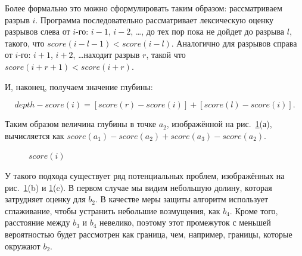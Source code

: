 \documentclass[12pt]{article}
\begin{document}
\begin{enumerate}
{		Более формально это можно сформулировать таким образом: рассматриваем разрыв $i$. Программа последовательно рассматривает лексическую оценку разрывов слева от $i$-го: $i-1$, $i-2$, \ldots, до тех пор пока не дойдет до разрыва $l$, такого, что $score(i-l-1) < score(i-l)$. Аналогично для разрывов справа от $i$-го: $i+1$, $i+2$, \ldots находит разрыв $r$, такой что $score(i+r+1) < score(i+r)$. 
		
		И, наконец, получаем значение глубины: 
		\vspace{-35pt}
		\begin{center}
			$$depth-score(i) = [score(r) - score(i)] + [score(l) - score(i)].$$
		\end{center}
		
		Таким образом величина глубины в точке $a_2$, изображённой на \linebreak рис.~\ref{im3}(а), вычисляется как $score(a_1) - score(a_2) + score(a_3) - score(a_2)$.
		
		\vspace{5pt}
		\begin{figure}[h!]
			\caption{$score(i)$}
			\label{im3}
		\end{figure}
		\vspace{5pt}
		
		У такого подхода существует ряд потенциальных проблем, изображённых на рис.~\ref{im3}(b) и \ref{im3}(c). В первом случае мы видим небольшую долину, которая затрудняет оценку для $b_2$. В качестве меры защиты алгоритм использует сглаживание, чтобы устранить небольшие возмущения, как $b_4$. Кроме того, расстояние между $b_3$ и $b_4$ невелико, поэтому этот промежуток с меньшей вероятностью будет рассмотрен как граница, чем, например, границы, которые окружают $b_2$. 
		
}
\end{enumerate}
\end{document}
